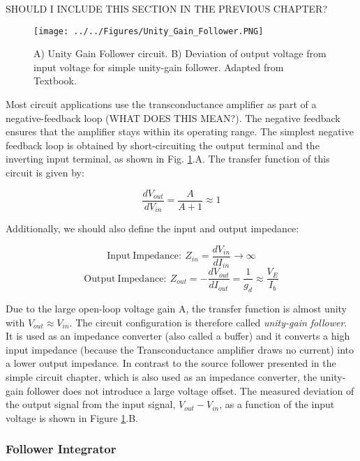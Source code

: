 SHOULD I INCLUDE THIS SECTION IN THE PREVIOUS CHAPTER? 

\begin{figure}[H]
    \centering
    \texttt{[image: ../../Figures/Unity\_Gain\_Follower.PNG]}
    \caption{A) Unity Gain Follower circuit. B) Deviation of output voltage from input voltage for simple unity-gain follower. Adapted from Textbook.}
    \label{fig:Unity_Gain_Follower}
\end{figure}

Most circuit applications use the transconductance amplifier as part of a negative-feedback loop (WHAT DOES THIS MEAN?). The negative feedback ensures that the amplifier stays within its operating range. The simplest negative feedback loop is obtained by short-circuiting the output terminal and the inverting  input terminal, as shown in Fig. \ref{fig:Unity_Gain_Follower}.A. The transfer function of this circuit is given by:

\begin{equation}
    \frac{dV_{out}}{dV_{in}} = \frac{A}{A + 1} \approx 1
\end{equation}

Additionally, we should also define the input and output impedance: 

\begin{equation}
    \mathrm{Input \ Impedance: \ } Z_{in} = \frac{dV_{in}}{dI_{in}} \rightarrow \infty
\end{equation}
\begin{equation}
    \mathrm{Output \ Impedance: \ } Z_{out} = -\frac{dV_{out}}{dI_{out}} = \frac{1}{g_d} \approx \frac{V_E}{I_b}
\end{equation}

Due to the large open-loop voltage gain A, the transfer function is almost unity with $V_{out} \approx V_{in}$. The circuit configuration is therefore called \textit{unity-gain follower}. It is used as an impedance converter (also called a buffer) and it converts a high input impedance (because the Transconductance amplifier draws no current) into a lower output impedance. In contrast to the source follower presented in the simple circuit chapter, which is also used as an impedance converter, the unity-gain follower does not introduce a large voltage offset. The measured deviation of the output signal from the input signal, $V_{out} - V_{in}$, as a function of the input voltage is shown in Figure \ref{fig:Unity_Gain_Follower}.B.


\subsubsection{Follower Integrator} \label{sec:follower_integrator}

